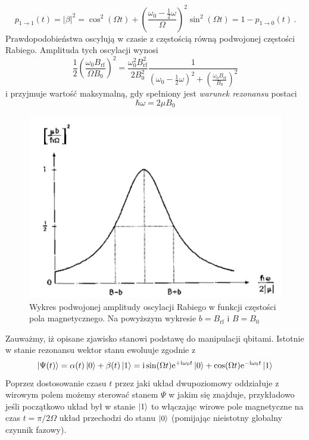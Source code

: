 \documentclass{myclass}
\begin{document}
\begin{equation*}
        p_{1\to1}(t) = |\beta|^2 =\cos^2(\Omega t) + \left(\frac{\omega_0 - \frac{1}{2}\omega}{\Omega}\right)^2\sin^2(\Omega t) = 1 - p_{1\to 0}(t)\,.
\end{equation*}
Prawdopodobieństwa oscylują w czasie z częstością równą podwojonej częstości Rabiego. Amplituda tych
oscylacji wynosi
\begin{equation*}
    \frac{1}{2}\left(\frac{\omega_0B_\text{rf}}{\Omega B_0}\right)^2 = \frac{\omega_0^2B_\text{rf}^2}{2B_0^2}\frac{1}{\left(\omega_0 - \frac{1}{2}\omega\right)^2 +
    \left(\frac{\omega_0B_\text{rf}}{B_0}\right)^2}
\end{equation*}
i przyjmuje wartość maksymalną, gdy spełniony jest \textit{warunek rezonansu} postaci
\begin{equation*}
    \boxed{\hbar\omega = 2\mu B_0}
\end{equation*}
\begin{figure}[ht]
    \centering
    \includegraphics[width=0.7\columnwidth]{figs/nmr.png}
    \caption{Wykres podwojonej amplitudy oscylacji Rabiego w funkcji częstości pola magnetycznego.
    Na powyższym wykresie \(b=B_\text{rf}\) i \(B=B_0\)}
\end{figure}

Zauważmy, iż opisane zjawisko stanowi podstawę do manipulacji qbitami. Istotnie w stanie rezonansu
wektor stanu ewoluuje zgodnie z
\begin{equation*}
    \ket{\Psi(t)} = \alpha(t)\ket{0} + \beta(t)\ket{1} = \mathrm{i}\sin(\Omega t)\mathrm{e}^{+\mathrm{i}\omega_0 t}\ket{0} + \cos(\Omega t)\mathrm{e}^{-\mathrm{i}\omega_0 t}\ket{1}
\end{equation*}
Poprzez dostosowanie czasu \(t\) przez jaki układ dwupoziomowy oddziałuje z wirowym polem możemy
sterować stanem \(\Psi\) w jakim się znajduje, przykładowo jeśli początkowo układ był w stanie
\(\ket{1}\) to włączając wirowe pole magnetyczne na czas \(t = \pi/2\Omega\) układ przechodzi do
stanu \(\ket{0}\) (pomijając nieistotny globalny czynnik fazowy).
\end{document}
